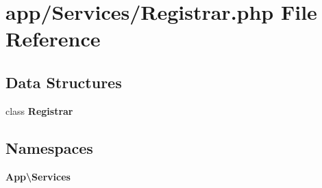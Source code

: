 \section{app/\+Services/\+Registrar.php File Reference}
\label{app_2_services_2_registrar_8php}
\subsection*{Data Structures}
\begin{DoxyCompactItemize}
\item 
class {\bf Registrar}
\end{DoxyCompactItemize}
\subsection*{Namespaces}
\begin{DoxyCompactItemize}
\item 
 {\bf App\textbackslash{}\+Services}
\end{DoxyCompactItemize}
